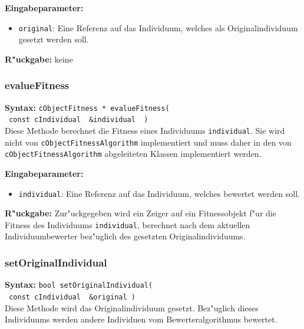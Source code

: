 \bigskip\noindent
\textbf{Eingabeparameter:}
\begin{itemize}
 \item \verb|original|: Eine Referenz auf das Individuum, welches als Originalindividuum gesetzt werden soll.
\end{itemize}

\bigskip\noindent
\textbf{R"uckgabe:} keine


\subsubsection{evalueFitness}

\textbf{Syntax:} \verb|cObjectFitness * evalueFitness(| \\\verb| const cIndividual  &individual  )| \\

Diese Methode berechnet die Fitness eines Individuums \verb|individual|. Sie wird nicht von \verb|cObjectFitnessAlgorithm| implementiert und muss daher in den von \verb|cObjectFitnessAlgorithm| abgeleiteten Klassen implementiert werden.

\bigskip\noindent
\textbf{Eingabeparameter:}
\begin{itemize}
 \item \verb|individual|: Eine Referenz auf das Individuum, welches bewertet werden soll.
\end{itemize}

\bigskip\noindent
\textbf{R"uckgabe:} Zur"uckgegeben wird ein Zeiger auf ein Fitnessobjekt f"ur die Fitness des Individuums \verb|individual|, berechnet nach dem aktuellen Individuumbewerter bez"uglich des gesetzten Originalindividuums.


\subsubsection{setOriginalIndividual}

\textbf{Syntax:} \verb|bool setOriginalIndividual(| \\\verb| const cIndividual  &original )| \\

Diese Methode wird das Originalindividuum gesetzt. Bez"uglich dieses Individuums werden andere Individuen vom Bewerteralgorithmus bewertet.

